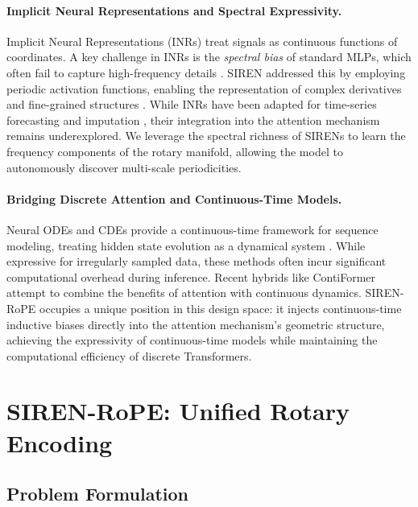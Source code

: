 \documentclass{article}
\begin{document}
\paragraph{Implicit Neural Representations and Spectral Expressivity.} 
Implicit Neural Representations (INRs) treat signals as continuous functions of coordinates. A key challenge in INRs is the \emph{spectral bias} of standard MLPs, which often fail to capture high-frequency details \citep{tancik2020fourier}. SIREN addressed this by employing periodic activation functions, enabling the representation of complex derivatives and fine-grained structures \citep{sitzmann2020siren}. While INRs have been adapted for time-series forecasting and imputation \citep{fons2022hypertime, lenaour2024inrts}, their integration into the attention mechanism remains underexplored. We leverage the spectral richness of SIRENs to learn the frequency components of the rotary manifold, allowing the model to autonomously discover multi-scale periodicities.

\paragraph{Bridging Discrete Attention and Continuous-Time Models.} 
Neural ODEs and CDEs provide a continuous-time framework for sequence modeling, treating hidden state evolution as a dynamical system \citep{chen2018neuralode, kidger2020neuralcde}. While expressive for irregularly sampled data, these methods often incur significant computational overhead during inference. Recent hybrids like ContiFormer \citep{chen2024contiformer} attempt to combine the benefits of attention with continuous dynamics. SIREN-RoPE occupies a unique position in this design space: it injects continuous-time inductive biases directly into the attention mechanism's geometric structure, achieving the expressivity of continuous-time models while maintaining the computational efficiency of discrete Transformers.

\section{SIREN-RoPE: Unified Rotary Encoding}
\label{sec:method}

\subsection{Problem Formulation}
\end{document}
